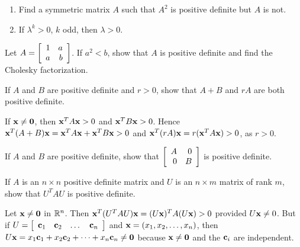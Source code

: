 \begin{multicols}{2}
\begin{ex}
\begin{enumerate}[label={\alph*.}]
\item Find a symmetric matrix $A$ such that $A^{2}$ is positive definite but $A$ is not.

\end{enumerate}
\begin{sol}
\begin{enumerate}[label={\alph*.}]
\setcounter{enumi}{1}
\item  If $\lambda^{k} > 0$, $k$ odd, then $\lambda > 0$.

\end{enumerate}
\end{sol}
\end{ex}

\begin{ex}
Let $A = \left[ \begin{array}{rr}
1 & a \\
a & b
\end{array}\right]$. If $a^{2} < b$, show that $A$ is positive definite and find the Cholesky factorization.
\end{ex}

\begin{ex}
If $A$ and $B$ are positive definite and $r > 0$, show that $A + B$ and $rA$ are both positive definite.

\begin{sol}
If $\textbf{x} \neq \textbf{0}$, then $\textbf{x}^{T}A\textbf{x} > 0$ and $\textbf{x}^{T}B\textbf{x} > 0$. Hence $\textbf{x}^{T}(A + B)\textbf{x} = \textbf{x}^{T}A\textbf{x} + \textbf{x}^{T}B\textbf{x} > 0$ and $\textbf{x}^{T}(rA)\textbf{x} = r(\textbf{x}^{T}A\textbf{x}) > 0$, as $r > 0$.
\end{sol}
\end{ex}

\begin{ex}
If $A$ and $B$ are positive definite, show that $\left[ \begin{array}{rr}
A & 0 \\
0 & B
\end{array}\right]$ is positive definite.
\end{ex}

\begin{ex}
If $A$ is an $n \times n$ positive definite matrix and $U$ is an $n \times m$ matrix of rank $m$, show that $U^{T}AU$ is positive definite.

\begin{sol}
Let $\textbf{x} \neq \textbf{0}$ in $\mathbb{R}^n$. Then $\textbf{x}^{T}(U^{T}AU)\textbf{x} = (U\textbf{x})^{T}A(U\textbf{x}) > 0$ provided $U\textbf{x} \neq 0$. But if $U = \left[ \begin{array}{cccc}
\textbf{c}_{1} & \textbf{c}_{2} & \dots &  \textbf{c}_{n}
\end{array}\right]$ and $\textbf{x} = (x_{1}, x_{2}, \dots, x_{n})$, then $U\textbf{x} = x_{1}\textbf{c}_{1} + x_{2}\textbf{c}_{2} + \dots  + x_{n}\textbf{c}_{n} \neq \textbf{0}$ because $\textbf{x} \neq \textbf{0}$ and the $\textbf{c}_{i}$ are independent.
\end{sol}
\end{ex}


\end{multicols}
